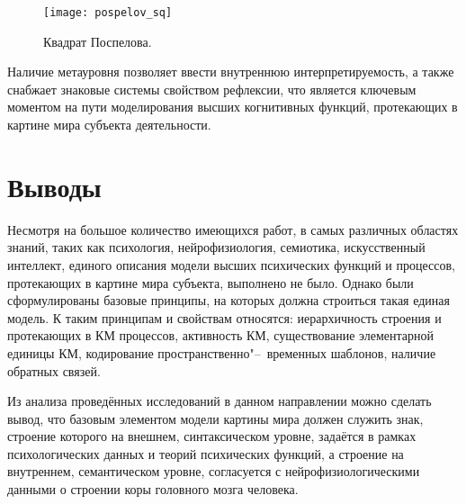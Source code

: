 \begin{figure}[h]
	\centering
	\texttt{[image: pospelov\_sq]}
	\caption{Квадрат Поспелова.}
	\label{fg:pospelov_sq}
\end{figure}
	
Наличие метауровня позволяет ввести внутреннюю интерпретируемость, а также снабжает знаковые системы свойством рефлексии, что является ключевым моментом на пути моделирования высших когнитивных функций, протекающих в картине мира субъекта деятельности.


\section{Выводы} \label{sect1_4}

Несмотря на большое количество имеющихся работ, в самых различных областях знаний, таких как психология, нейрофизиология, семиотика, искусственный интеллект, единого описания модели высших психических функций и процессов, протекающих в картине мира субъекта, выполнено не было. Однако были сформулированы базовые принципы, на которых должна строиться такая единая модель. К таким принципам и свойствам относятся: иерархичность строения и протекающих в КМ процессов, активность КМ, существование элементарной единицы КМ, кодирование пространственно"--~временных шаблонов, наличие обратных связей. 

Из анализа проведённых исследований в данном направлении можно сделать вывод, что базовым элементом модели картины мира должен служить знак, строение которого на внешнем, синтаксическом уровне, задаётся в рамках психологических данных и теорий психических функций, а строение на внутреннем, семантическом уровне, согласуется с нейрофизиологическими данными о строении коры головного мозга человека.

\clearpage